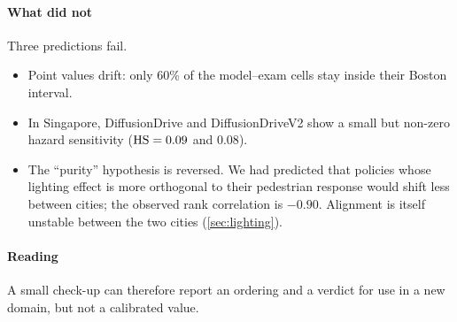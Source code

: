 \paragraph{What did not}
Three predictions fail.
\begin{itemize}
\item Point values drift: only 60\% of the model--exam cells stay inside their Boston interval.
\item In Singapore, DiffusionDrive and DiffusionDriveV2 show a small but non-zero hazard sensitivity
      ($\mathrm{HS}=0.09$ and $0.08$).
\item The ``purity'' hypothesis is reversed. We had predicted that policies whose lighting effect is
      more orthogonal to their pedestrian response would shift less between cities; the observed rank
      correlation is $-0.90$. Alignment is itself unstable between the two cities (\cref{sec:lighting}).
\end{itemize}

\paragraph{Reading}
A small check-up can therefore report an ordering and a verdict for use in a new domain, but not a
calibrated value.
